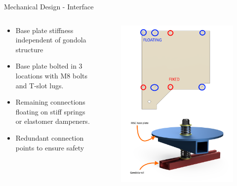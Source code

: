 \documentclass[11pt, aspectratio=169]{beamer}
\begin{document}
\begin{frame}[c]{Mechanical Design - Interface}
    \begin{columns}[t]
            \begin{column}{.5\textwidth}
                \begin{itemize}
                    \item Base plate stiffness independent of gondola structure
                    \item Base plate bolted in 3 locations with M8 bolts and T-slot lugs.
                    \item Remaining connections floating on stiff springs or elastomer dampeners.
                    \item Redundant connection points to ensure safety
                \end{itemize}
            \end{column}

            \begin{column}{.5\textwidth}
                \begin{figure}
                     \includegraphics[height=0.9\textheight]{mechanical/interface.png}
                \end{figure}
            \end{column}
        \end{columns}
\end{frame}
\end{document}
